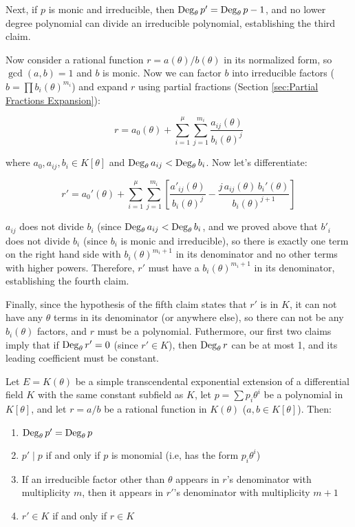 Next, if $p$ is monic and irreducible, then ${\rm Deg}_\theta\, p' =
{\rm Deg}_\theta\, p - 1$, and no lower degree polynomial can divide
an irreducible polynomial, establishing the third claim.

Now consider a rational function $r=a(\theta)/b(\theta)$ in its
normalized form, so $\gcd(a,b) = 1$ and $b$ is monic.  Now we can
factor $b$ into irreducible factors ($b=\prod b_i(\theta)^{m_i}$) and
expand $r$ using partial fractions (Section \ref{sec:Partial Fractions
Expansion}):

$$r = a_0(\theta) + \sum_{i=1}^\mu \sum_{j=1}^{m_i} \frac{a_{ij}(\theta)}{b_i(\theta)^j}$$

where $a_0, a_{ij}, b_i \in K[\theta]$ and ${\rm Deg}_\theta\, a_{ij} < {\rm
Deg}_\theta\, b_i$.  Now let's differentiate:

$$r' = a_0'(\theta) + \sum_{i=1}^\mu \sum_{j=1}^{m_i} \left[
\frac{a'_{ij}(\theta)}{b_i(\theta)^j} - \frac{j\, a_{ij}(\theta)\,
b_i'(\theta)}{b_i(\theta)^{j+1}} \right]$$

$a_{ij}$ does not divide $b_i$ (since ${\rm Deg}_\theta\, a_{ij} <
{\rm Deg}_\theta\, b_i$, and we proved above that $b'_i$ does not
divide $b_i$ (since $b_i$ is monic and irreducible), so there is
exactly one term on the right hand side with $b_i(\theta)^{m_i + 1}$
in its denominator and no other terms with higher powers.  Therefore,
$r'$ must have a $b_i(\theta)^{m_i +1}$ in its denominator, establishing
the fourth claim.

Finally, since the hypothesis of the fifth claim states that $r'$ is in
$K$, it can not have any $\theta$ terms in its denominator (or
anywhere else), so there can not be any $b_i(\theta)$ factors, and $r$
must be a polynomial.  Futhermore, our first two claims imply that if
${\rm Deg}_\theta\, r' = 0$ (since $r'\in K$), then ${\rm
Deg}_\theta\, r$ can be at most 1, and its leading coefficient must be
constant.

\endtheorem

\theorem\label{basic exponential properties}
Let $E=K(\theta)$ be a simple transcendental exponential extension of
a differential field $K$ with the same constant subfield as $K$,
let $p=\sum p_i \theta^i$ be a polynomial in $K[\theta]$,
and let $r=a/b$ be a rational function in $K(\theta)$
($a, b \in K[\theta]$).  Then:

\begin{enumerate}
\item ${\rm Deg}_\theta\, p' = {\rm Deg}_\theta\, p$
\item $p' \mid p$ if and only if $p$ is monomial (i.e, has the form $p_i \theta^i$)
\item If an irreducible factor other than $\theta$ appears in $r$'s
denominator with multiplicity $m$,
then it appears in $r'$'s denominator with multiplicity $m+1$
\item $r' \in K$ if and only if $r \in K$
\end{enumerate}


